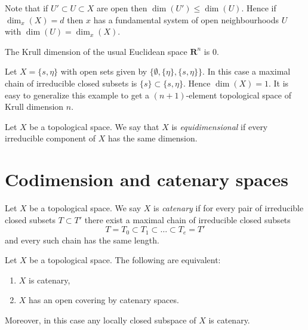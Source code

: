 \noindent
Note that if $U' \subset U \subset X$ are open then
$\dim(U') \leq \dim(U)$. Hence if $\dim_x(X) = d$ then $x$
has a fundamental system of open neighbourhoods $U$ with
$\dim(U) = \dim_x(X)$.

\begin{example}
\label{example-Krull-Rn}
The Krull dimension of the usual Euclidean space
$\mathbf{R}^n$ is $0$.
\end{example}

\begin{example}
\label{example-krull-2set}
Let $X = \{s, \eta\}$ with open sets given
by $\{\emptyset, \{\eta\}, \{s, \eta\}\}$.
In this case a maximal chain of irreducible
closed subsets is $\{s\} \subset \{s, \eta\}$.
Hence $\dim(X) = 1$. It is easy to generalize
this example to get a $(n + 1)$-element topological
space of Krull dimension $n$.
\end{example}

\begin{definition}
\label{definition-equidimensional}
Let $X$ be a topological space.
We say that $X$ is {\it equidimensional} if every irreducible
component of $X$ has the same dimension.
\end{definition}





\section{Codimension and catenary spaces}
\label{section-catenary-spaces}

\begin{definition}
\label{definition-catenary}
Let $X$ be a topological space. We say $X$ is {\it catenary} if
for every pair of irreducible closed subsets $T \subset T'$
there exist a maximal chain of irreducible closed subsets
$$
T = T_0 \subset T_1 \subset \ldots \subset T_e = T'
$$
and every such chain has the same length.
\end{definition}

\begin{lemma}
\label{lemma-catenary}
Let $X$ be a topological space.
The following are equivalent:
\begin{enumerate}
\item $X$ is catenary,
\item $X$ has an open covering by catenary spaces.
\end{enumerate}
Moreover, in this case any locally closed subspace of $X$ is catenary.
\end{lemma}

